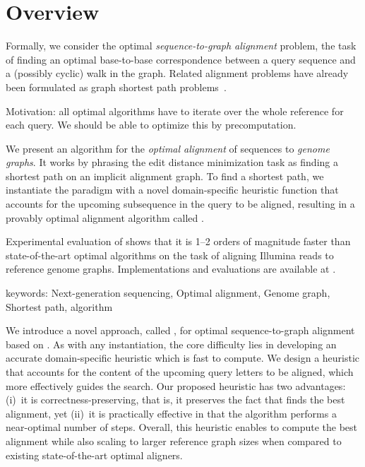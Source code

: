 \section{Overview}

Formally, we consider the optimal \emph{sequence-to-graph alignment} problem,
the task of finding an optimal base-to-base correspondence between a query
sequence and a (possibly cyclic) walk in the graph. Related alignment problems
have already been formulated as graph shortest path
problems~\cite{jain_complexity_2019}.

Motivation: all optimal algorithms have to iterate over the whole reference for
each query. We should be able to optimize this by precomputation.

We present an algorithm for the \emph{optimal alignment} of sequences to
\emph{genome graphs}. It works by phrasing the edit distance minimization
task as finding a shortest path on an implicit alignment graph. To find a
shortest path, we instantiate the \A paradigm with a novel domain-specific
heuristic function that accounts for the upcoming subsequence in the query
to be aligned, resulting in a provably optimal alignment algorithm called
\astarix.

\quad \quad Experimental evaluation of \astarix shows that it is 1--2
orders of magnitude faster than state-of-the-art optimal algorithms on the
task of aligning Illumina reads to reference genome graphs. Implementations
and evaluations are available at \mbox{\astarixurl}.

keywords: Next-generation sequencing, Optimal alignment, Genome graph,
Shortest path, \A algorithm

We introduce a novel approach, called \astarix, for optimal sequence-to-graph
alignment based on \A. As with any \A instantiation, the core difficulty lies in
developing an accurate domain-specific heuristic which is fast to compute. We
design a heuristic that accounts for the content of the upcoming query letters
to be aligned, which more effectively guides the search. Our proposed heuristic
has two advantages: (i)~it is correctness-preserving, that is, it preserves the
fact that \astarix finds the best alignment, yet (ii)~it is practically
effective in that the algorithm performs a near-optimal number of steps.
Overall, this heuristic enables \astarix to compute the best alignment while
also scaling to larger reference graph sizes when compared to existing
state-of-the-art optimal aligners.

